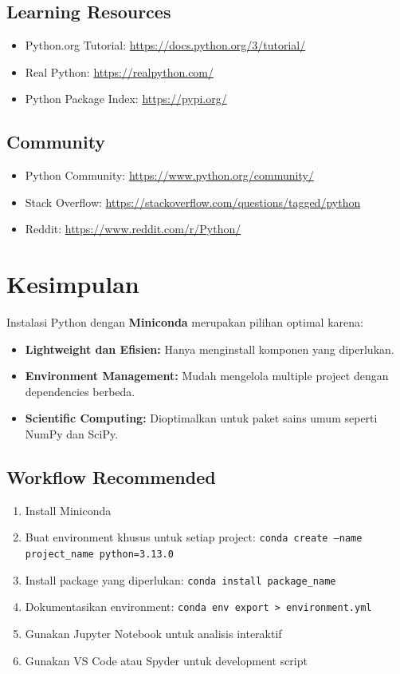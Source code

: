 \subsection{Learning Resources}
\begin{itemize}
    \item Python.org Tutorial: \url{https://docs.python.org/3/tutorial/}
    \item Real Python: \url{https://realpython.com/}
    \item Python Package Index: \url{https://pypi.org/}
\end{itemize}

\subsection{Community}
\begin{itemize}
    \item Python Community: \url{https://www.python.org/community/}
    \item Stack Overflow: \url{https://stackoverflow.com/questions/tagged/python}
    \item Reddit: \url{https://www.reddit.com/r/Python/}
\end{itemize}

\section{Kesimpulan}

Instalasi Python dengan \textbf{Miniconda} merupakan pilihan optimal karena:

\begin{itemize}
    \item \textbf{Lightweight dan Efisien:} Hanya menginstall komponen yang diperlukan.
    \item \textbf{Environment Management:} Mudah mengelola multiple project dengan dependencies berbeda.
    \item \textbf{Scientific Computing:} Dioptimalkan untuk paket sains umum seperti NumPy dan SciPy.
\end{itemize}

\subsection{Workflow Recommended}

\begin{enumerate}
    \item Install Miniconda
    \item Buat environment khusus untuk setiap project: \texttt{conda create --name project\_name python=3.13.0}
    \item Install package yang diperlukan: \texttt{conda install package\_name}
    \item Dokumentasikan environment: \texttt{conda env export > environment.yml}
    \item Gunakan Jupyter Notebook untuk analisis interaktif
    \item Gunakan VS Code atau Spyder untuk development script
\end{enumerate}

